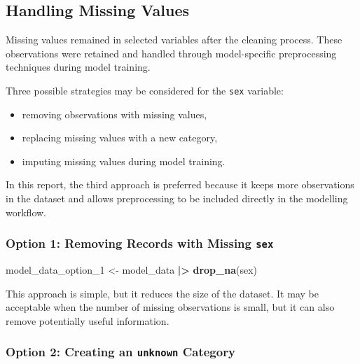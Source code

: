 \documentclass[
]{article}
\newenvironment{Shaded}{\begin{snugshade}}{\end{snugshade}}
\newcommand{\FunctionTok}[1]{\textcolor[rgb]{0.13,0.29,0.53}{\textbf{#1}}}
\newcommand{\NormalTok}[1]{#1}
\newcommand{\OtherTok}[1]{\textcolor[rgb]{0.56,0.35,0.01}{#1}}
\newcommand{\SpecialCharTok}[1]{\textcolor[rgb]{0.81,0.36,0.00}{\textbf{#1}}}
\providecommand{\tightlist}{%
  \setlength{\itemsep}{0pt}\setlength{\parskip}{0pt}}
\begin{document}
\subsection{Handling Missing Values}\label{handling-missing-values}

Missing values remained in selected variables after the cleaning
process. These observations were retained and handled through
model-specific preprocessing techniques during model training.

Three possible strategies may be considered for the \texttt{sex}
variable:

\begin{itemize}
\tightlist
\item
  removing observations with missing values,
\item
  replacing missing values with a new category,
\item
  imputing missing values during model training.
\end{itemize}

In this report, the third approach is preferred because it keeps more
observations in the dataset and allows preprocessing to be included
directly in the modelling workflow.

\subsubsection{\texorpdfstring{Option 1: Removing Records with Missing
\texttt{sex}}{Option 1: Removing Records with Missing sex}}\label{option-1-removing-records-with-missing-sex}

\begin{Shaded}
\begin{Highlighting}[]
\NormalTok{model\_data\_option\_1 }\OtherTok{\textless{}{-}}\NormalTok{ model\_data }\SpecialCharTok{|\textgreater{}}
  \FunctionTok{drop\_na}\NormalTok{(sex)}
\end{Highlighting}
\end{Shaded}

This approach is simple, but it reduces the size of the dataset. It may
be acceptable when the number of missing observations is small, but it
can also remove potentially useful information.

\subsubsection{\texorpdfstring{Option 2: Creating an \texttt{unknown}
Category}{Option 2: Creating an unknown Category}}\label{option-2-creating-an-unknown-category}
\end{document}
